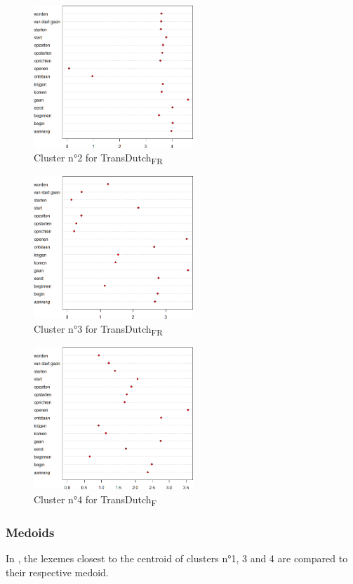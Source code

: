 \begin{figure}
\includegraphics[width=6cm]{figures/Vandevoorde2-img83.png}
\caption{\label{fig:4:80}Cluster n°2 for TransDutch\textsubscript{FR}}
\end{figure}

\begin{figure}
\includegraphics[width=6cm]{figures/Vandevoorde2-img84.png}
\caption{\label{fig:4:81}Cluster n°3 for TransDutch\textsubscript{FR}}
\end{figure}

\begin{figure}
\includegraphics[width=6cm]{figures/Vandevoorde2-img85.png}
\caption{\label{fig:4:82}Cluster n°4 for TransDutch\textsubscript{F}}
\end{figure}

\subsubsection{Medoids}
\label{sec:4.4.3.2}  
In , the lexemes closest to the centroid of clusters n°1, 3 and 4 are compared to their respective medoid.

